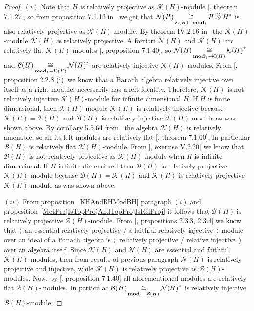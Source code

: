 \begin{proof} $(i)$ Note that $H$ is relatively projective as
$\mathcal{K}(H)$-module [\cite{HelBanLocConvAlg}, theorem 7.1.27], so from
proposition 7.1.13 in~\cite{HelBanLocConvAlg} we get that
$\mathcal{N}(H)\mathop{\mathbin{\cong}}\limits_{\mathcal{K}(H)-\mathbf{mod}_1}H\mathbin{\widehat{\otimes}} H^*$ is also
relatively projective as $\mathcal{K}(H)$-module. By theorem IV.2.16
in~\cite{HelHomolBanTopAlg} the $\mathcal{K}(H)$-module $\mathcal{K}(H)$ is
relatively projective. A fortiori $\mathcal{N}(H)$ and $\mathcal{K}(H)$ are
relatively flat $\mathcal{K}(H)$-modules 
[\cite{HelBanLocConvAlg}, proposition 7.1.40], 
so $\mathcal{N}(H)\mathop{\mathbin{\cong}}\limits_{\mathbf{mod}_1-\mathcal{K}(H)}{\mathcal{K}(H)}^*$
and  $\mathcal{B}(H)\mathop{\mathbin{\cong}}\limits_{\mathbf{mod}_1-\mathcal{K}(H)}{\mathcal{N}(H)}^*$ are
relatively injective $\mathcal{K}(H)$-modules. From
[\cite{RamsHomPropSemgroupAlg}, proposition 2.2.8  (i)] we know that a Banach
algebra relatively injective over itself as a right module, necessarily has a
left identity. Therefore, $\mathcal{K}(H)$ is not relatively injective
$\mathcal{K}(H)$-module for infinite dimensional $H$. If $H$ is finite
dimensional, then $\mathcal{K}(H)$-module $\mathcal{K}(H)$ is relatively
injective because $\mathcal{K}(H)=\mathcal{B}(H)$ and $\mathcal{B}(H)$ is
relatively injective $\mathcal{K}(H)$-module as was shown above. By corollary
5.5.64 from~\cite{DalBanAlgAutCont} the algebra $\mathcal{K}(H)$ is relatively
amenable, so all its left modules are relatively flat [\cite{HelBanLocConvAlg},
theorem 7.1.60]. In particular $\mathcal{B}(H)$ is relatively flat
$\mathcal{K}(H)$-module. From [\cite{HelHomolBanTopAlg}, exercise V.2.20] we
know that $\mathcal{B}(H)$ is not relatively projective as
$\mathcal{K}(H)$-module when $H$ is infinite dimensional. If $H$ is finite
dimensional then $\mathcal{B}(H)$ is relatively projective
$\mathcal{K}(H)$-module because $\mathcal{B}(H)=\mathcal{K}(H)$ and
$\mathcal{K}(H)$ is relatively projective $\mathcal{K}(H)$-module as was shown
above.

$(ii)$ From proposition~\ref{KHAndBHModBH} paragraph $(i)$ and
proposition~\ref{MetProjIsTopProjAndTopProjIsRelProj} it follows that
$\mathcal{B}(H)$ is relatively projective $\mathcal{B}(H)$-module. From
[\cite{RamsHomPropSemgroupAlg}, propositions 2.3.3, 2.3.4] we know that
$\langle$~an essential relatively projective / a faithful relatively
injective~$\rangle$ module over an ideal of a Banach algebra 
is $\langle$~relatively projective / relative injective~$\rangle$ over 
an algebra itself. Since $\mathcal{K}(H)$ and $\mathcal{N}(H)$ are essential 
and faithful $\mathcal{K}(H)$-modules, then from results of previous paragraph
$\mathcal{N}(H)$ is relatively projective and injective, while $\mathcal{K}(H)$
is relatively projective as $\mathcal{B}(H)$-modules. Now, by
[\cite{HelBanLocConvAlg}, proposition 7.1.40] all aforementioned modules are
relatively flat $\mathcal{B}(H)$-modules. In particular
$\mathcal{B}(H)\mathop{\mathbin{\cong}}\limits_{\mathbf{mod}_1-\mathcal{B}(H)}{\mathcal{N}(H)}^*$ is
relatively injective $\mathcal{B}(H)$-module.
\end{proof}

